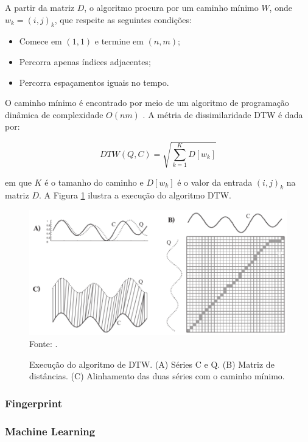 A partir da matriz \({D}\), o algoritmo procura por um caminho mínimo \({W}\), onde \({w_{k} = (i,j)_{k}}\), que respeite as seguintes condições:

\begin{itemize}
    \item Comece em \({(1,1)}\) e termine em \({(n,m)}\);
    \item Percorra apenas índices adjacentes;
    \item Percorra espaçamentos iguais no tempo.
\end{itemize}

O caminho mínimo é encontrado por meio de um algoritmo de programação dinâmica de complexidade \({O(nm)}\) \cite{keogh2004}. A métria de dissimilaridade DTW é dada por:

\begin{equation}
    DTW(Q,C) = \sqrt{\sum_{k=1}^{K} D[w_{k}]}
\end{equation}

em que \({K}\) é o tamanho do caminho e \({D[w_{k}]}\) é o valor da entrada \({(i,j)_{k}}\) na matriz \({D}\). A Figura \ref{fig:dtw} ilustra a execução do algoritmo DTW.

\begin{figure}[!htb]
   \centering
   \caption{Execução do algoritmo de DTW. (A) Séries C e Q. (B) Matriz de distâncias. (C) Alinhamento das duas séries com o caminho mínimo.}\label{fig:dtw} 
   \includegraphics[scale=0.47]{figuras/dtw.png}
   Fonte: \cite{keogh2004}.
\end{figure}

\subsubsection{Fingerprint}

\subsubsection{Machine Learning}

